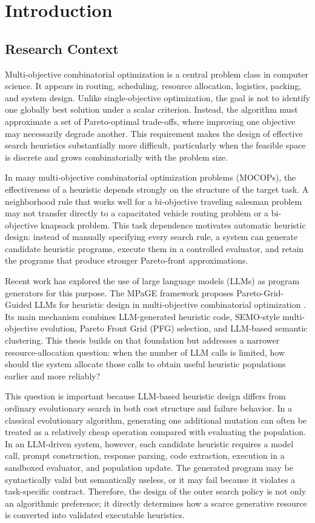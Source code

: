 \chapter{Introduction}

\section{Research Context}

Multi-objective combinatorial optimization is a central problem class in computer science. It appears in routing, scheduling, resource allocation, logistics, packing, and system design. Unlike single-objective optimization, the goal is not to identify one globally best solution under a scalar criterion. Instead, the algorithm must approximate a set of Pareto-optimal trade-offs, where improving one objective may necessarily degrade another. This requirement makes the design of effective search heuristics substantially more difficult, particularly when the feasible space is discrete and grows combinatorially with the problem size.

In many multi-objective combinatorial optimization problems (MOCOPs), the effectiveness of a heuristic depends strongly on the structure of the target task. A neighborhood rule that works well for a bi-objective traveling salesman problem may not transfer directly to a capacitated vehicle routing problem or a bi-objective knapsack problem. This task dependence motivates automatic heuristic design: instead of manually specifying every search rule, a system can generate candidate heuristic programs, execute them in a controlled evaluator, and retain the programs that produce stronger Pareto-front approximations.

Recent work has explored the use of large language models (LLMs) as program generators for this purpose. The MPaGE framework proposes Pareto-Grid-Guided LLMs for heuristic design in multi-objective combinatorial optimization \cite{ha2026mpage}. Its main mechanism combines LLM-generated heuristic code, SEMO-style multi-objective evolution, Pareto Front Grid (PFG) selection, and LLM-based semantic clustering. This thesis builds on that foundation but addresses a narrower resource-allocation question: when the number of LLM calls is limited, how should the system allocate those calls to obtain useful heuristic populations earlier and more reliably?

This question is important because LLM-based heuristic design differs from ordinary evolutionary search in both cost structure and failure behavior. In a classical evolutionary algorithm, generating one additional mutation can often be treated as a relatively cheap operation compared with evaluating the population. In an LLM-driven system, however, each candidate heuristic requires a model call, prompt construction, response parsing, code extraction, execution in a sandboxed evaluator, and population update. The generated program may be syntactically valid but semantically useless, or it may fail because it violates a task-specific contract. Therefore, the design of the outer search policy is not only an algorithmic preference; it directly determines how a scarce generative resource is converted into validated executable heuristics.


